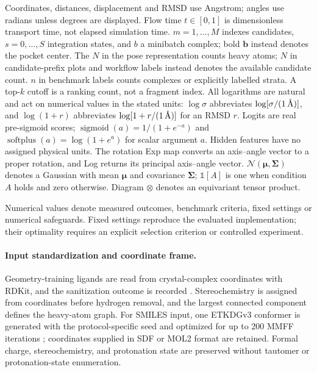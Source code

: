 \documentclass{article}
\renewcommand{\boldsymbol}[1]{\pmb{#1}}
\newcommand{\angstrom}{\text{\normalfont\AA}}
\newcommand{\citep}[1]{\cite{#1}}
\begin{document}
Coordinates, distances, displacement and RMSD use Angstrom; angles use radians unless degrees are displayed. Flow time \(t\in[0,1]\) is dimensionless transport time, not elapsed simulation time. \(m=1,\ldots,M\) indexes candidates, \(s=0,\ldots,S\) integration states, and \(b\) a minibatch complex; bold \(\mathbf b\) instead denotes the pocket center. The \(N\) in the pose representation counts heavy atoms; \(N\) in candidate-prefix plots and workflow labels instead denotes the available candidate count. \(n\) in benchmark labels counts complexes or explicitly labelled strata. A top-\(k\) cutoff is a ranking count, not a fragment index. All logarithms are natural and act on numerical values in the stated units: \(\log\sigma\) abbreviates \(\log[\sigma/(1\,\angstrom)]\), and \(\log(1+r)\) abbreviates \(\log[1+r/(1\,\angstrom)]\) for an RMSD \(r\). Logits are real pre-sigmoid scores; \(\operatorname{sigmoid}(a)=1/(1+e^{-a})\) and \(\operatorname{softplus}(a)=\log(1+e^a)\) for scalar argument \(a\). Hidden features have no assigned physical units. The rotation Exp map converts an axis--angle vector to a proper rotation, and Log returns its principal axis--angle vector. \(\mathcal N(\boldsymbol\mu,\boldsymbol\Sigma)\) denotes a Gaussian with mean \(\boldsymbol\mu\) and covariance \(\boldsymbol\Sigma\); \(\mathbb 1[A]\) is one when condition \(A\) holds and zero otherwise. Diagram \(\otimes\) denotes an equivariant tensor product.

Numerical values denote measured outcomes, benchmark criteria, fixed settings or numerical safeguards. Fixed settings reproduce the evaluated implementation; their optimality requires an explicit selection criterion or controlled experiment.

\paragraph{Input standardization and coordinate frame.}
Geometry-training ligands are read from crystal-complex coordinates with RDKit, and the sanitization outcome is recorded \citep{landrum2024rdkit}.
Stereochemistry is assigned from coordinates before hydrogen removal, and the largest connected component defines the heavy-atom graph.
For SMILES input, one ETKDGv3 conformer is generated with the protocol-specific seed \citep{wang2020etkdgv3} and optimized for up to 200 MMFF iterations \citep{halgren1996mmff}; coordinates supplied in SDF or MOL2 format are retained.
Formal charge, stereochemistry, and protonation state are preserved without tautomer or protonation-state enumeration.
\end{document}
